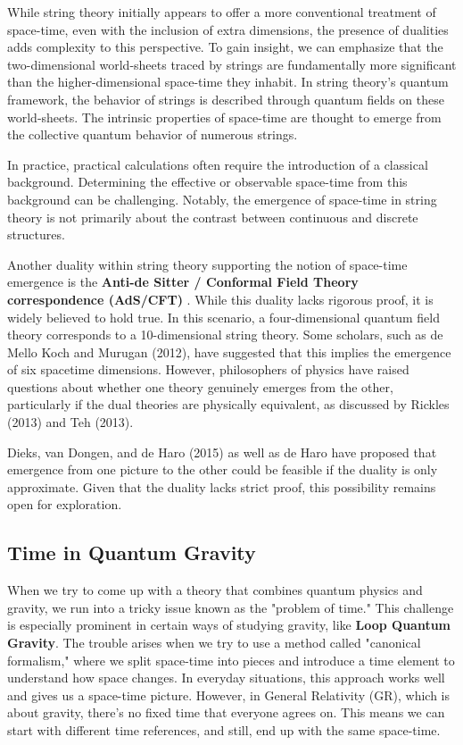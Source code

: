 \documentclass[11pt]{article}
\begin{document}
While string theory initially appears to offer a more conventional treatment of space-time, even with the inclusion of extra dimensions, the presence of dualities adds complexity to this perspective. To gain insight, we can emphasize that the two-dimensional world-sheets traced by strings are fundamentally more significant than the higher-dimensional space-time they inhabit. In string theory's quantum framework, the behavior of strings is described through quantum fields on these world-sheets. The intrinsic properties of space-time are thought to emerge from the collective quantum behavior of numerous strings.

In practice, practical calculations often require the introduction of a classical background. Determining the effective or observable space-time from this background can be challenging. Notably, the emergence of space-time in string theory is not primarily about the contrast between continuous and discrete structures.

Another duality within string theory supporting the notion of space-time emergence is the \textbf{Anti-de Sitter / Conformal Field Theory correspondence (AdS/CFT)} \cite{rickles2013ads}. While this duality lacks rigorous proof, it is widely believed to hold true. In this scenario, a four-dimensional quantum field theory corresponds to a 10-dimensional string theory. Some scholars, such as de Mello Koch \cite{demellokoch2012emergent} and Murugan (2012)\cite{murugan2012foundations}, have suggested that this implies the emergence of six spacetime dimensions. However, philosophers of physics have raised questions about whether one theory genuinely emerges from the other, particularly if the dual theories are physically equivalent, as discussed by Rickles (2013) \cite{rickles2013dual} and Teh (2013)\cite{teh2013holography,Teh2016-TEHGAG-2}.

Dieks, van Dongen, and de Haro (2015) \cite{dieks2015emergence} as well as de Haro \cite{deharoforthcoming} have proposed that emergence from one picture to the other could be feasible if the duality is only approximate. Given that the duality lacks strict proof, this possibility remains open for exploration.

\subsection{Time in Quantum Gravity}

When we try to come up with a theory that combines quantum physics and gravity, we run into a tricky issue known as the "problem of time." This challenge is especially prominent in certain ways of studying gravity, like \textbf{Loop Quantum Gravity}. The trouble arises when we try to use a method called "canonical formalism," \cite{rickles2006time} where we split space-time into pieces and introduce a time element to understand how space changes. In everyday situations, this approach works well and gives us a space-time picture. However, in General Relativity (GR), which is about gravity, there's no fixed time that everyone agrees on. This means we can start with different time references, and still, end up with the same space-time.
\end{document}
